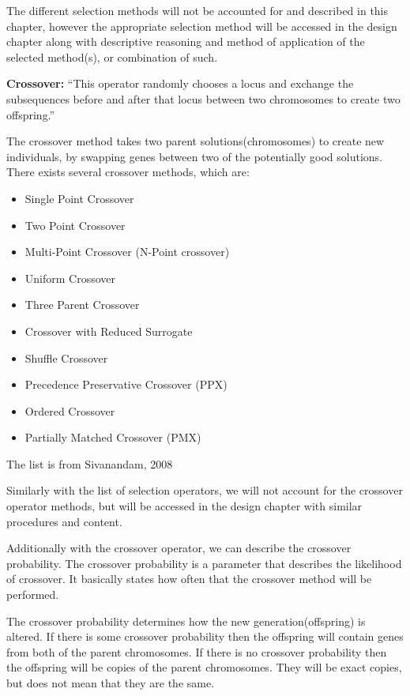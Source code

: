 The different selection methods will not be accounted for and described in this chapter, however the appropriate selection method will be accessed in the design chapter along with descriptive reasoning and method of application of the selected method(s), or combination of such.

\textbf{Crossover:} \enquote{This operator randomly chooses a locus and exchange the subsequences before and after that locus between two chromosomes to create two offspring.} \cite[pp. 8]{Melanie1990}

The crossover method takes two parent solutions(chromosomes) to create new individuals, by swapping genes between two of the potentially good solutions. There exists several crossover methods, which are:


\begin{itemize}
\item Single Point Crossover
\item Two Point Crossover
\item Multi-Point Crossover (N-Point crossover)
\item Uniform Crossover
\item Three Parent Crossover
\item Crossover with Reduced Surrogate
\item Shuffle Crossover
\item Precedence Preservative Crossover (PPX)
\item Ordered Crossover
\item Partially Matched Crossover (PMX)
\end{itemize}
The list is from Sivanandam, 2008 \cite[pp. 50-56]{Sivanandam2008}

Similarly with the list of selection operators, we will not account for the crossover operator methods, but will be accessed in the design chapter with similar procedures and content.

Additionally with the crossover operator, we can describe the crossover probability.
The crossover probability is a parameter that describes the likelihood of crossover. It basically states how often that the crossover method will be performed.\cite[pp. 56]{Sivanandam2008}

The crossover probability determines how the new generation(offspring) is altered. If there is some crossover probability then the offspring will contain genes from both of the parent chromosomes. If there is no crossover probability then the offspring will be copies of the parent chromosomes. They will be exact copies, but does not mean that they are the same.


